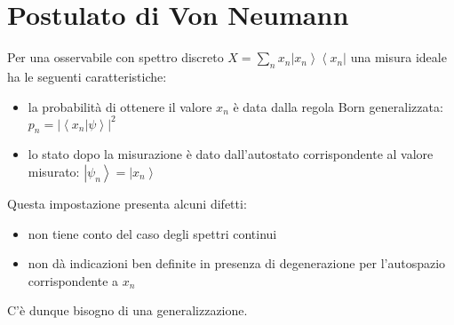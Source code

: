 \section{Postulato di Von Neumann} %
Per una osservabile con spettro discreto $X=\sum_n{x_n\left |x_n \right\rangle\left\langle x_n\right |}$ una misura ideale ha le seguenti caratteristiche:
\begin{itemize}
\item la probabilità di ottenere il valore $x_n$ è data dalla regola Born generalizzata: $p_n=|\left\langle x_n|\psi  \right\rangle|^2$
\item lo stato dopo la misurazione è dato dall'autostato corrispondente al valore misurato: $\left |\psi _n \right\rangle=\left |x_n \right\rangle$
\end{itemize}
Questa impostazione presenta alcuni difetti:
\begin{itemize}
\item non tiene conto del caso degli spettri continui
\item non dà indicazioni ben definite in presenza di degenerazione per l'autospazio corrispondente a $x_n$
\end{itemize}
C'è dunque bisogno di una generalizzazione.


